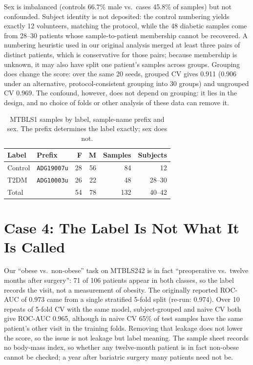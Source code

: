 \documentclass[conference]{IEEEtran}
\newcommand{\verified}[1]{#1}  %
\begin{document}
Sex is imbalanced (controls \verified{66.7\%} male vs.\ cases
\verified{45.8\%} of samples) but not confounded. Subject identity is not
deposited: the control numbering yields exactly 12 volunteers, matching the
protocol, while the 48 diabetic samples come from 28--30 patients whose
sample-to-patient membership cannot be recovered. A numbering heuristic used
in our original analysis merged at least three pairs of distinct patients,
which is conservative for those pairs; because membership is unknown, it may
also have split one patient's samples across groups. Grouping does change the
score: over the same 20 seeds, grouped CV gives \verified{0.911}
(\verified{0.906} under an alternative, protocol-consistent grouping into 30
groups) and ungrouped CV \verified{0.969}. The confound, however, does not
depend on grouping: it lies in the design, and no choice of folds or other
analysis of these data can remove it.

\begin{table}[t]
\centering
\caption{MTBLS1 samples by label, sample-name prefix and sex. The prefix
determines the label exactly; sex does not.}
\label{tab:case3}
\footnotesize
\begin{tabular}{@{}llrrrr@{}}
\toprule
Label & Prefix & F & M & Samples & Subjects \\
\midrule
Control & \texttt{ADG19007u} & 28 & 56 & 84 & 12 \\
T2DM    & \texttt{ADG10003u} & 26 & 22 & 48 & 28--30 \\
\midrule
Total   &                    & 54 & 78 & 132 & 40--42 \\
\bottomrule
\end{tabular}
\end{table}

\section{Case 4: The Label Is Not What It Is Called}
\label{sec:case4}
Our ``obese vs.\ non-obese'' task on MTBLS242 is in fact ``preoperative vs.\
twelve months after surgery'': \verified{71} of \verified{106} patients
appear in both classes, so the label records the visit, not a measurement of
obesity. The originally reported ROC-AUC of 0.973 came from a single
stratified 5-fold split (re-run: \verified{0.974}). Over 10 repeats of 5-fold
CV with the same model, subject-grouped and naive CV both give ROC-AUC
\verified{0.965}, although in naive CV \verified{65\%} of test samples
have the same patient's other visit in the training folds. Removing that
leakage does not lower the score, so the issue is not leakage but label
meaning. The sample sheet records no body-mass
index, so whether any twelve-month patient is in fact non-obese cannot be
checked; a year after bariatric surgery many patients need not be.
\end{document}
